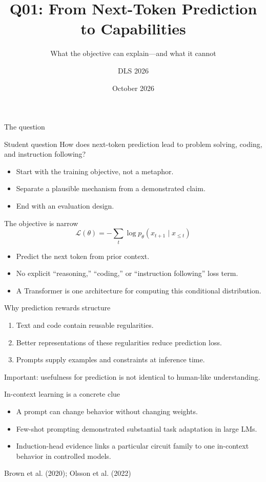 \documentclass[aspectratio=169,10pt]{beamer}
\title{Q01: From Next-Token Prediction to Capabilities}
\subtitle{What the objective can explain---and what it cannot}
\author{DLS 2026}
\date{October 2026}
\begin{document}
\maketitle
\begin{frame}{The question}
\begin{block}{Student question}
How does next-token prediction lead to problem solving, coding, and instruction following?
\end{block}
\begin{itemize}
\item Start with the training objective, not a metaphor.
\item Separate a plausible mechanism from a demonstrated claim.
\item End with an evaluation design.
\end{itemize}
\end{frame}
\begin{frame}{The objective is narrow}
\[\mathcal{L}(\theta)=-\sum_t \log p_\theta(x_{t+1}\mid x_{\leq t})\]
\begin{itemize}
\item Predict the next token from prior context.
\item No explicit ``reasoning,'' ``coding,'' or ``instruction following'' loss term.
\item A Transformer is one architecture for computing this conditional distribution.
\end{itemize}
\end{frame}
\begin{frame}{Why prediction rewards structure}
\begin{enumerate}
\item Text and code contain reusable regularities.
\item Better representations of these regularities reduce prediction loss.
\item Prompts supply examples and constraints at inference time.
\end{enumerate}
\alert{Important:} usefulness for prediction is not identical to human-like understanding.
\end{frame}
\begin{frame}{In-context learning is a concrete clue}
\begin{itemize}
\item A prompt can change behavior without changing weights.
\item Few-shot prompting demonstrated substantial task adaptation in large LMs.
\item Induction-head evidence links a particular circuit family to one in-context behavior in controlled models.
\end{itemize}
\vfill\small Brown et al. (2020); Olsson et al. (2022)
\end{frame}
\end{document}
